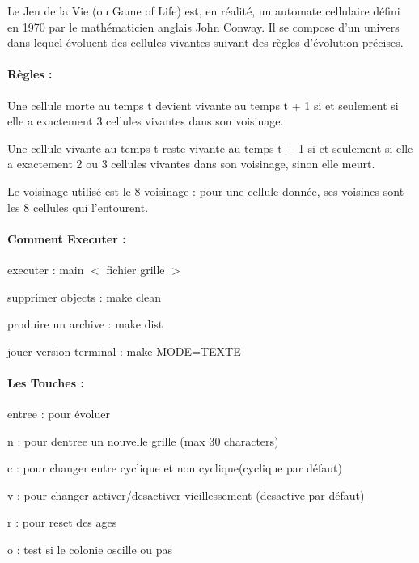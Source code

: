 Le Jeu de la Vie (ou Game of Life) est, en réalité, un automate cellulaire défini en 1970 par le mathématicien anglais John Conway. Il se compose d’un univers dans lequel évoluent des cellules vivantes suivant des règles d’évolution précises.

\paragraph*{Règles \+:}


\begin{DoxyItemize}
\item Une cellule morte au temps t devient vivante au temps t + 1 si et seulement si elle a exactement 3 cellules vivantes dans son voisinage.
\item Une cellule vivante au temps t reste vivante au temps t + 1 si et seulement si elle a exactement 2 ou 3 cellules vivantes dans son voisinage, sinon elle meurt.
\item Le voisinage utilisé est le 8-\/voisinage \+: pour une cellule donnée, ses voisines sont les 8 cellules qui l’entourent.
\end{DoxyItemize}

\paragraph*{Comment Executer \+:}


\begin{DoxyItemize}
\item executer \+: main $<$ fichier grille $>$
\item supprimer objects \+: make clean
\item produire un archive \+: make dist
\item jouer version terminal \+: make M\+O\+DE=T\+E\+X\+TE
\end{DoxyItemize}

\paragraph*{Les Touches \+:}


\begin{DoxyItemize}
\item entree \+: pour évoluer
\item n \+: pour d\textquotesingle{}entree un nouvelle grille (max 30 characters)
\item c \+: pour changer entre cyclique et non cyclique(cyclique par défaut)
\item v \+: pour changer activer/desactiver vieillessement (desactive par défaut)
\item r \+: pour reset des ages
\item o \+: test si le colonie oscille ou pas
\end{DoxyItemize}

